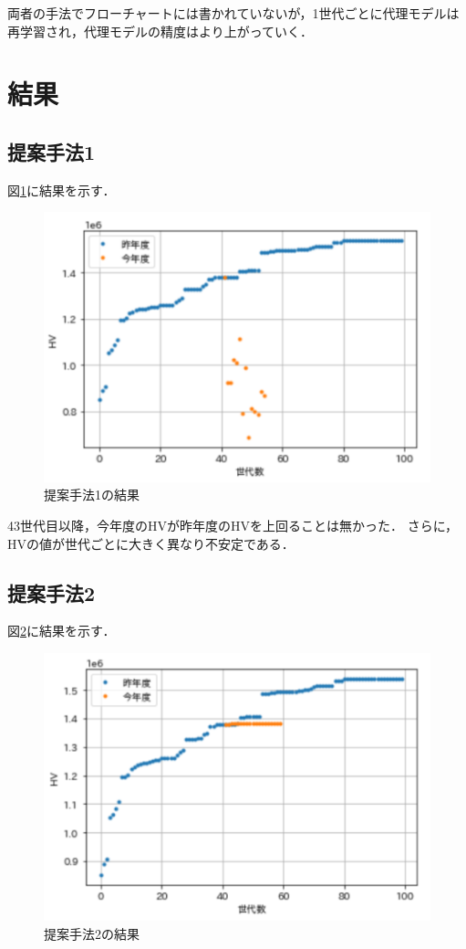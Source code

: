 \documentclass[main]{subfiles}
\begin{document}
        両者の手法でフローチャートには書かれていないが，1世代ごとに代理モデルは再学習され，代理モデルの精度はより上がっていく．

    \section{結果}
        \subsection{提案手法1}
        図\ref{d_result}に結果を示す．
        \begin{figure}
            \centering
            \includegraphics[width=\linewidth]{figures/d_result.png}
            \caption{提案手法1の結果}
            \label{d_result}
        \end{figure}

        43世代目以降，今年度のHVが昨年度のHVを上回ることは無かった．
        さらに，HVの値が世代ごとに大きく異なり不安定である．
        \subsection{提案手法2}
        図\ref{k_result}に結果を示す．
        \begin{figure}
            \centering
            \includegraphics[width=\linewidth]{figures/k_result.png}
            \caption{提案手法2の結果}
            \label{k_result}
        \end{figure}
\end{document}
